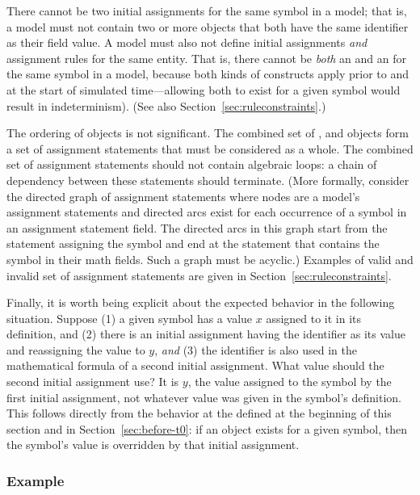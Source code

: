 There cannot be two initial assignments for the same symbol in a
model; that is, a model must not contain two or more
\InitialAssignment objects that both have the same identifier as
their  field value.  A model must also not define
initial assignments \emph{and} assignment rules for the same
entity.  That is, there cannot be \emph{both} an
\InitialAssignment and an \AssignmentRule for the same symbol in a
model, because both kinds of constructs apply prior to and at the
start of simulated time---allowing both to exist for a given
symbol would result in indeterminism).  (See also
Section~\ref{sec:ruleconstraints}.)

The ordering of \InitialAssignment objects is not significant.
The combined set of \InitialAssignment, \AssignmentRule and
\KineticLaw objects form a set of assignment statements that must
be considered as a whole.  The combined set of assignment
statements should not contain algebraic loops: a chain of
dependency between these statements should terminate.  (More
formally, consider the directed graph of assignment statements
where nodes are a model's assignment statements and directed arcs
exist for each occurrence of a symbol in an assignment statement
 field.  The directed arcs in this graph start from
the statement assigning the symbol and end at the statement that
contains the symbol in their math fields.  Such a graph must be
acyclic.) Examples of valid and invalid set of assignment
statements are given in Section~\ref{sec:ruleconstraints}.

Finally, it is worth being explicit about the expected behavior in
the following situation.  Suppose (1) a given symbol has a value
$x$ assigned to it in its definition, and (2) there is an initial
assignment having the identifier as its  value and
reassigning the value to $y$, \emph{and} (3) the identifier is
also used in the mathematical formula of a second initial
assignment.  What value should the second initial assignment use?
It is $y$, the value assigned to the symbol by the first initial
assignment, not whatever value was given in the symbol's
definition.  This follows directly from the behavior at the
defined at the beginning of this section and in
Section~\ref{sec:before-t0}: if an \InitialAssignment object
exists for a given symbol, then the symbol's value is overridden
by that initial assignment.


\subsubsection{Example}

